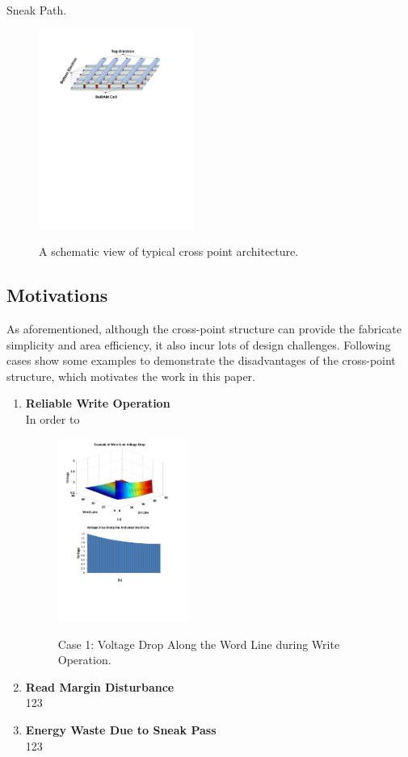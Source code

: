 Sneak Path.
\begin{figure}
\centering
  \includegraphics[width=0.45\textwidth]{./figures/crossbar_array.pdf}\\
  \caption{A schematic view of typical cross point architecture.}\label{fig:array}
\end{figure}

\subsection{Motivations}
As aforementioned, although the cross-point structure can provide the fabricate simplicity and area efficiency, it also incur lots of design challenges. Following cases show some examples to demonstrate the disadvantages of the cross-point structure, which motivates the work in this paper.
\begin{enumerate}
  \item \textbf{Reliable Write Operation}\\
  In order to

\begin{figure}
\centering
  \includegraphics[width=0.4\textwidth]{./figures/example1_large.pdf}\\
  \caption{Case 1: Voltage Drop Along the Word Line during Write Operation.}\label{fig:exampl1}
\end{figure}

  \item \textbf{Read Margin Disturbance}\\
  123
  \item \textbf{Energy Waste Due to Sneak Pass}\\
  123
\end{enumerate}

~\cite{crossbar_NANO08_Nauenheim}~\cite{memristor:analog}~\cite{moore}

